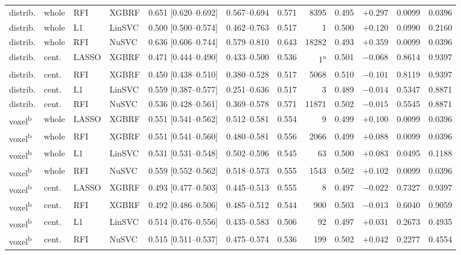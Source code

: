 {\begin{tabular}{llllccrrcrrr}
distrib.                 & whole & RFI   & XGBRF  & 0.651 [0.620--0.692] & 0.567--0.694 & 0.571 & 8395                 & 0.495 & $+0.297$ & 0.0099 & 0.0396 \\
distrib.                 & whole & L1    & LinSVC & 0.500 [0.500--0.574] & 0.462--0.763 & 0.517 & 1                    & 0.500 & $+0.120$ & 0.0990 & 0.2160 \\
distrib.                 & whole & RFI   & NuSVC  & 0.636 [0.606--0.744] & 0.579--0.810 & 0.643 & 18282                & 0.493 & $+0.359$ & 0.0099 & 0.0396 \\
\midrule
distrib.                 & cent. & LASSO & XGBRF  & 0.471 [0.444--0.490] & 0.433--0.500 & 0.536 & 1\textsuperscript{a} & 0.501 & $-0.068$ & 0.8614 & 0.9397 \\
distrib.                 & cent. & RFI   & XGBRF  & 0.450 [0.438--0.510] & 0.380--0.528 & 0.517 & 5068                 & 0.510 & $-0.101$ & 0.8119 & 0.9397 \\
distrib.                 & cent. & L1    & LinSVC & 0.559 [0.387--0.577] & 0.251--0.636 & 0.517 & 3                    & 0.489 & $-0.014$ & 0.5347 & 0.8871 \\
distrib.                 & cent. & RFI   & NuSVC  & 0.536 [0.428--0.561] & 0.369--0.578 & 0.571 & 11871                & 0.502 & $-0.015$ & 0.5545 & 0.8871 \\
\midrule
voxel\textsuperscript{b} & whole & LASSO & XGBRF  & 0.551 [0.541--0.562] & 0.512--0.581 & 0.554 & 9                    & 0.499 & $+0.100$ & 0.0099 & 0.0396 \\
voxel\textsuperscript{b} & whole & RFI   & XGBRF  & 0.551 [0.541--0.560] & 0.480--0.581 & 0.556 & 2066                 & 0.499 & $+0.088$ & 0.0099 & 0.0396 \\
voxel\textsuperscript{b} & whole & L1    & LinSVC & 0.531 [0.531--0.548] & 0.502--0.596 & 0.545 & 63                   & 0.500 & $+0.083$ & 0.0495 & 0.1188 \\
voxel\textsuperscript{b} & whole & RFI   & NuSVC  & 0.559 [0.552--0.562] & 0.518--0.573 & 0.555 & 1543                 & 0.502 & $+0.102$ & 0.0099 & 0.0396 \\
\midrule
voxel\textsuperscript{b} & cent. & LASSO & XGBRF  & 0.493 [0.477--0.503] & 0.445--0.513 & 0.555 & 8                    & 0.497 & $-0.022$ & 0.7327 & 0.9397 \\
voxel\textsuperscript{b} & cent. & RFI   & XGBRF  & 0.492 [0.486--0.506] & 0.485--0.512 & 0.544 & 900                  & 0.503 & $-0.013$ & 0.6040 & 0.9059 \\
voxel\textsuperscript{b} & cent. & L1    & LinSVC & 0.514 [0.476--0.556] & 0.435--0.583 & 0.506 & 92                   & 0.497 & $+0.031$ & 0.2673 & 0.4935 \\
voxel\textsuperscript{b} & cent. & RFI   & NuSVC  & 0.515 [0.511--0.537] & 0.475--0.574 & 0.536 & 199                  & 0.502 & $+0.042$ & 0.2277 & 0.4554 \\
\bottomrule
\end{tabular}}

